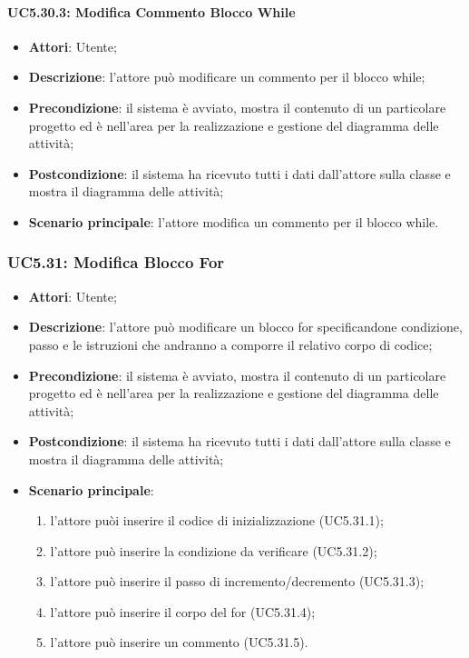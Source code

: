 \paragraph{UC5.30.3: Modifica Commento Blocco While}
\label{UC5.30.3}
\begin{itemize}
	\item \textbf{Attori}: Utente;
	\item \textbf{Descrizione}: l'attore può modificare un commento per il blocco while;
	\item \textbf{Precondizione}: il sistema è avviato, mostra il contenuto di un particolare progetto ed è nell'area per la realizzazione e gestione del diagramma delle attività;
	\item \textbf{Postcondizione}: il sistema ha ricevuto tutti i dati dall'attore sulla classe e mostra il diagramma delle attività;
	\item \textbf{Scenario principale}: l'attore modifica un commento per il blocco while.
\end{itemize}

\subsubsection{UC5.31: Modifica Blocco For}
\label{UC5.31}
\begin{itemize}
	\item \textbf{Attori}: Utente;
	\item \textbf{Descrizione}: l'attore può modificare un blocco for specificandone condizione, passo e le istruzioni che andranno a comporre il relativo corpo di codice;
	\item \textbf{Precondizione}: il sistema è avviato, mostra il contenuto di un particolare progetto ed è nell'area per la realizzazione e gestione del diagramma delle attività;
	\item \textbf{Postcondizione}: il sistema ha ricevuto tutti i dati dall'attore sulla classe e mostra il diagramma delle attività;
	\item \textbf{Scenario principale}:
	\begin{enumerate}
		\item l'attore puòi inserire il codice di inizializzazione (UC5.31.1);
		\item l'attore può inserire la condizione da verificare (UC5.31.2);
		\item l'attore può inserire il passo di incremento/decremento (UC5.31.3);
		\item l'attore può inserire il corpo del for (UC5.31.4);
		\item l'attore può inserire un commento (UC5.31.5).
	\end{enumerate}
\end{itemize}


